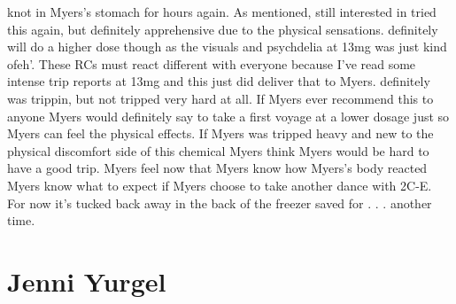 \documentclass[12pt]{book}
\begin{document}
knot in Myers's stomach for hours again. As mentioned, still interested in tried this again, but definitely apprehensive due to the physical sensations. definitely will do a higher dose though as the visuals and psychdelia at 13mg was just kind ofeh'. These RCs must react different with everyone because I've read some intense trip reports at 13mg and this just did deliver that to Myers. definitely was trippin, but not tripped very hard at all. If Myers ever recommend this to anyone Myers would definitely say to take a first voyage at a lower dosage just so Myers can feel the physical effects. If Myers was tripped heavy and new to the physical discomfort side of this chemical Myers think Myers would be hard to have a good trip. Myers feel now that Myers know how Myers's body reacted Myers know what to expect if Myers choose to take another dance with 2C-E. For now it's tucked back away in the back of the freezer saved for  . . .  another time.



\chapter{Jenni Yurgel}
\end{document}
